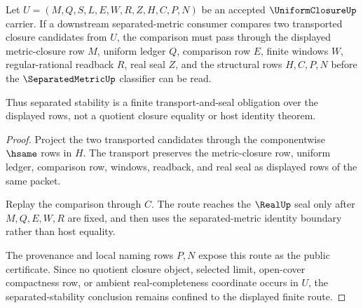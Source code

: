 \begin{theorem}
\label{thm:uniform-closure-separated-stability}
Let $U=(M,Q,S,L,E,W,R,Z,H,C,P,N)$ be an accepted $\UniformClosureUp$ carrier. If a downstream separated-metric consumer compares two transported closure candidates from $U$, the comparison must pass through the displayed metric-closure row $M$, uniform ledger $Q$, comparison row $E$, finite windows $W$, regular-rational readback $R$, real seal $Z$, and the structural rows $H,C,P,N$ before the $\SeparatedMetricUp$ classifier can be read.

Thus separated stability is a finite transport-and-seal obligation over the displayed rows, not a quotient closure equality or host identity theorem.
\end{theorem}
\begin{proof}
Project the two transported candidates through the componentwise $\hsame$ rows in $H$. The transport preserves the metric-closure row, uniform ledger, comparison row, windows, readback, and real seal as displayed rows of the same packet.

Replay the comparison through $C$. The route reaches the $\RealUp$ seal only after $M,Q,E,W,R$ are fixed, and then uses the separated-metric identity boundary rather than host equality.

The provenance and local naming rows $P,N$ expose this route as the public certificate. Since no quotient closure object, selected limit, open-cover compactness row, or ambient real-completeness coordinate occurs in $U$, the separated-stability conclusion remains confined to the displayed finite route.
\end{proof}


\begin{closurestatus}{\UniformClosureUp}
  \theoryclosure{\seedClosure}
  \formalstatus{\unformalizedV}
\end{closurestatus}
